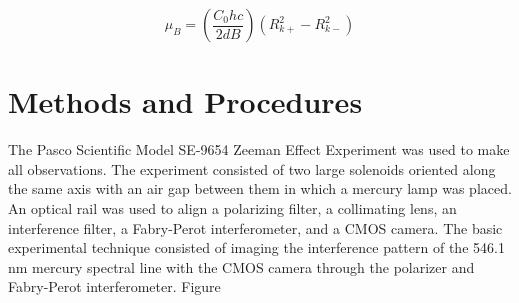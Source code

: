 \documentclass[twocolumn]{article}
\begin{document}
			\begin{equation}
				\mu_B = \left( \frac{C_0 hc}{2dB} \right) \left( R_{k+}^2 - R_{k-}^2 \right)
				\label{eq:BohrEquation}
			\end{equation}
		

		
\section{Methods and Procedures}
	The Pasco Scientific Model SE-9654 Zeeman Effect Experiment was used to make all observations.
	The experiment consisted of two large solenoids oriented along the same axis with an air gap between them in which a mercury lamp was placed.
	An optical rail was used to align a polarizing filter, a collimating lens, an interference filter, a Fabry-Perot interferometer, and a CMOS camera.
	The basic experimental technique consisted of imaging the interference pattern of the 546.1 nm mercury spectral line with the CMOS camera through the polarizer and Fabry-Perot interferometer.
	Figure 
	
\end{document}

